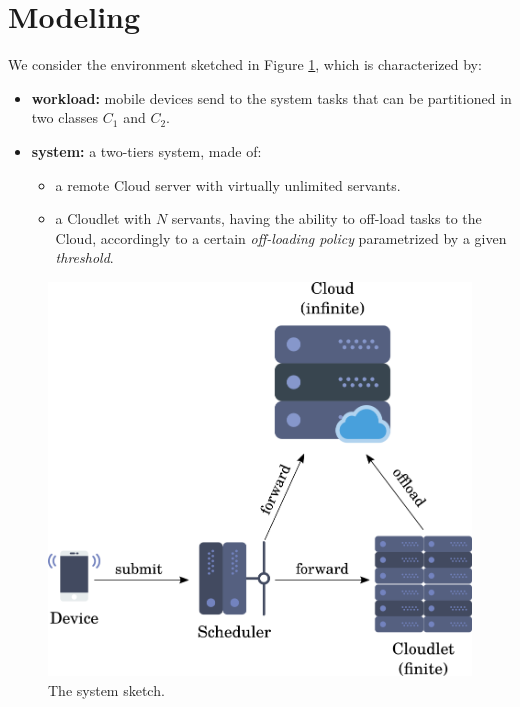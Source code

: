 \section{Modeling}
\label{sec:modeling}


We consider the environment sketched in Figure \ref{fig:modeling-system-sketch}, which is characterized by:

\begin{itemize}
	\item  \textbf{workload:} mobile devices send to the system tasks that can be partitioned in two classes $C_{1}$ and $C_{2}$.
	\item \textbf{system:} a two-tiers system, made of:	
	\begin{itemize}
		\item a remote Cloud server with virtually unlimited servants.
		\item a Cloudlet with $N$ servants, having the ability to off-load tasks to the Cloud, accordingly to a certain \textit{off-loading policy} parametrized by a given \textit{threshold}.
	\end{itemize}
\end{itemize}

\begin{figure}
	\includegraphics[width=\columnwidth]{fig/modeling-system-sketch}
	\caption{The system sketch.}
	\label{fig:modeling-system-sketch}
\end{figure}

